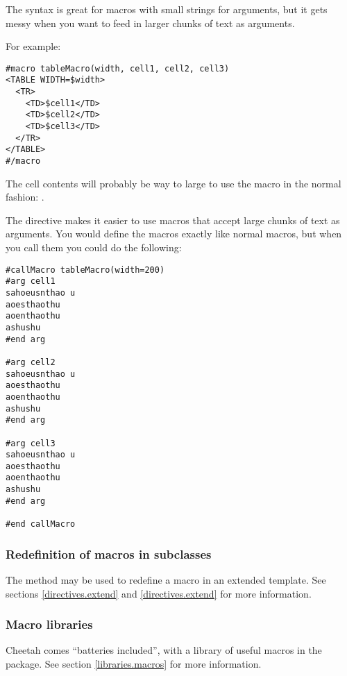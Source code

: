 The  syntax is great for macros with small strings for
arguments, but it gets messy when you want to feed in larger chunks of text as
arguments.  

For example:
\begin{verbatim}
#macro tableMacro(width, cell1, cell2, cell3)
<TABLE WIDTH=$width>
  <TR>
    <TD>$cell1</TD>
    <TD>$cell2</TD>
    <TD>$cell3</TD>
  </TR>
</TABLE>
#/macro
\end{verbatim}

The cell contents will probably be way to large to use the macro in the normal
fashion: .

The  directive makes it easier to use macros that accept
large chunks of text as arguments.  You would define the macros exactly like
normal macros, but when you call them you could do the following:

\begin{verbatim}
#callMacro tableMacro(width=200)
#arg cell1
sahoeusnthao u
aoesthaothu
aoenthaothu
ashushu
#end arg

#arg cell2
sahoeusnthao u
aoesthaothu
aoenthaothu
ashushu
#end arg

#arg cell3
sahoeusnthao u
aoesthaothu
aoenthaothu
ashushu
#end arg 

#end callMacro

\end{verbatim}


\subsubsection{Redefinition of macros in subclasses}
\label{directives.macros.redefine}

The  method may be used to
redefine a macro in an extended template.  See sections \ref{directives.extend}
and \ref{directives.extend} for more information.

\subsubsection{Macro libraries}
\label{directives.macros.libraries}

Cheetah comes ``batteries included'', with a library of useful macros in the
 package.  See section \ref{libraries.macros} for more
information.


